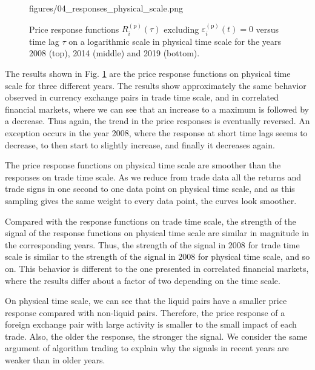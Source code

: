 \begin{figure}[htbp]
    {figures/04_responses_physical_scale.png}
    \caption{Price response functions
             $R^{\left(\textrm{p}\right)}_{i}\left(\tau\right)$ excluding
             $\varepsilon^{\left(\textrm{p}\right)}_{i}\left(t\right) = 0$ versus time
             lag $\tau$ on a logarithmic scale in physical time scale for the
             years 2008 (top), 2014 (middle) and 2019 (bottom).}
    \label{fig:response_function_physical_scale}
\end{figure}
The results shown in Fig. \ref{fig:response_function_physical_scale} are the
price response functions on physical time scale for three different years. The
results show approximately the same behavior observed in currency exchange
pairs in trade time scale, and in correlated financial markets, where we can
see that an increase to a maximum is followed by a decrease. Thus again, the
trend in the price responses is eventually reversed. An exception occurs in the
year 2008, where the response at short time lags seems to decrease, to then
start to slightly increase, and finally it decreases again.

The price response functions on physical time scale are smoother than the
responses on trade time scale. As we reduce from trade data all the returns and
trade signs in one second to one data point on physical time scale, and as this
sampling gives the same weight to every data point, the curves look smoother.

Compared with the response functions on trade time scale, the strength of the
signal of the response functions on physical time scale are similar in
magnitude in the corresponding years. Thus, the strength of the signal in 2008
for trade time scale is similar to the strength of the signal in 2008 for
physical time scale, and so on. This behavior is different to the one presented
in correlated financial markets, where the results differ about a factor of
two depending on the time scale.

On physical time scale, we can see that the liquid pairs have a smaller price
response compared with non-liquid pairs. Therefore, the price response of a
foreign exchange pair with large activity is smaller to the small impact of
each trade. Also, the older the response, the stronger the signal. We consider
the same argument of algorithm trading to explain why the signals in recent
years are weaker than in older years.
